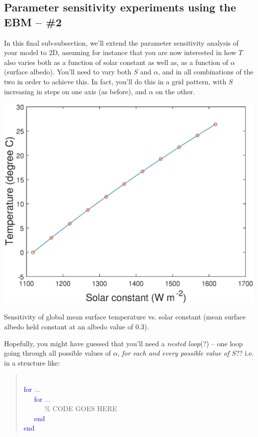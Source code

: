 \documentclass{tufte-book} %
\newenvironment{docspec}{\begin{quotation}\ttfamily\parskip0pt\parindent0pt\ignorespaces}{\end{quotation}}
\begin{document}
\subsection{Parameter sensitivity experiments using the EBM -- \#2}

In this final sub-subsection, we'll extend the parameter sensitivity analysis of your model to 2D, assuming for instance that you are  now interested in  how \(T\) also varies both as a function of solar constant as well as, as a function of \(\alpha\) (surface albedo). You'll need to vary both \(S\) and \(\alpha\), and in all combinations of the two in order to achieve this. In fact, you'll do this in a grid pattern, with \(S\) increasing in steps on one axis (as before), and \(\alpha\) on the other.

\begin{marginfigure}[-0.0in]
\includegraphics[width=\linewidth]{ch8-sens1D.eps}
\caption{Sensitivity of global mean surface temperature vs. solar constant (mean surface albedo held constant at an albedo value of 0.3).}
\label{fig:ch8-sens1D}
\end{marginfigure}

Hopefully, you might have guessed that you'll need a \textit{nested loop}(?) -- one loop going through all possible values of \(\alpha\), \textit{for each and every possible value of \(S\)}?? i.e. in a structure like:
\vspace{-1mm}\begin{docspec}
\\\textcolor{blue}{for} ...
\\ \ \ \ \textcolor{blue}{for} ...
\\ \ \ \ \ \ \ \textcolor[rgb]{0,0.501961,0}{\% CODE GOES HERE}
\\ \ \ \ \textcolor{blue}{end}
\\\textcolor{blue}{end}
\end{docspec}\vspace{-1mm}
\end{document}
